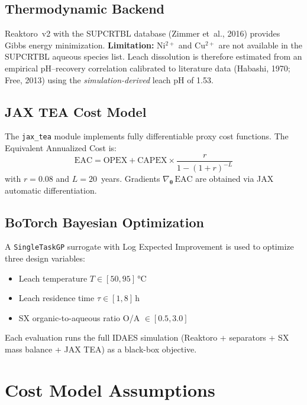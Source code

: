 \documentclass[11pt,a4paper]{article}
\begin{document}
\subsection{Thermodynamic Backend}

Reaktoro~v2 with the SUPCRTBL database (Zimmer et~al., 2016) provides
Gibbs energy minimization.  \textbf{Limitation:} Ni$^{2+}$ and Cu$^{2+}$
are not available in the SUPCRTBL aqueous species list.  Leach
dissolution is therefore estimated from an empirical pH--recovery
correlation calibrated to literature data (Habashi, 1970; Free, 2013)
using the \emph{simulation-derived} leach pH of 1.53.

\subsection{JAX TEA Cost Model}

The \texttt{jax\_tea} module implements fully differentiable proxy cost
functions.  The Equivalent Annualized Cost is:
\begin{equation}
  \text{EAC} = \text{OPEX} + \text{CAPEX} \times
  \frac{r}{1 - (1+r)^{-L}}
  \label{eq:eac}
\end{equation}
with $r=0.08$ and $L=20$~years.  Gradients
$\nabla_{\boldsymbol{\theta}}\,\text{EAC}$ are obtained via JAX
automatic differentiation.

\subsection{BoTorch Bayesian Optimization}

A \texttt{SingleTaskGP} surrogate with Log Expected Improvement is used
to optimize three design variables:
\begin{itemize}
  \item Leach temperature $T \in [50, 95]$\,\si{\celsius}
  \item Leach residence time $\tau \in [1, 8]$\,h
  \item SX organic-to-aqueous ratio O/A $\in [0.5, 3.0]$
\end{itemize}
Each evaluation runs the full IDAES simulation (Reaktoro + separators
+ SX mass balance + JAX TEA) as a black-box objective.

\section{Cost Model Assumptions}
\label{sec:cost}
\end{document}
